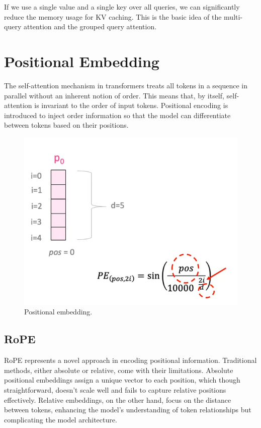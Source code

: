 If we use a single value and a single key over all queries, we can significantly reduce the memory usage for KV caching. This is the basic idea of the multi-query attention and the grouped query attention.
   

\section{Positional Embedding}

The self-attention mechanism in transformers treats all tokens in a sequence in parallel without an inherent notion of order. This means that, by itself, self-attention is invariant to the order of input tokens. Positional encoding is introduced to inject order information so that the model can differentiate between tokens based on their positions.

\begin{figure}[t]
	\centering
	\includegraphics[scale=0.6]{./images/transformer/positional_1.png}
	\caption{Positional embedding.}
\end{figure}

\subsection{RoPE}

RoPE represents a novel approach in encoding positional information. Traditional methods, either absolute or relative, come with their limitations. Absolute positional embeddings assign a unique vector to each position, which though straightforward, doesn't scale well and fails to capture relative positions effectively. Relative embeddings, on the other hand, focus on the distance between tokens, enhancing the model’s understanding of token relationships but complicating the model architecture.

